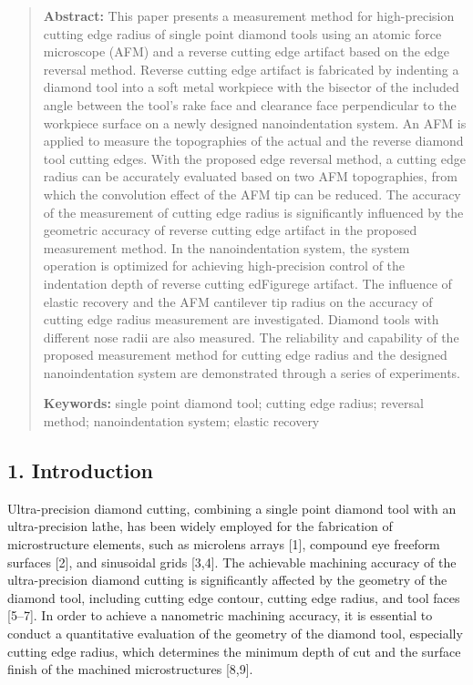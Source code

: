 \documentclass{article}
\begin{document}
\begin{quote}
\noindent\textbf{Abstract:} This paper presents a measurement method for high-precision cutting edge radius of single point diamond tools using an atomic force microscope (AFM) and a reverse cutting edge artifact based on the edge reversal method. Reverse cutting edge artifact is fabricated by indenting a diamond tool into a soft metal workpiece with the bisector of the included angle between the tool’s rake face and clearance face perpendicular to the workpiece surface on a newly designed nanoindentation system. An AFM is applied to measure the topographies of the actual and the reverse diamond tool cutting edges. With the proposed edge reversal method, a cutting edge radius can be accurately evaluated based on two AFM topographies, from which the convolution effect of the AFM tip can be reduced. The accuracy of the measurement of cutting edge radius is significantly influenced by the geometric accuracy of reverse cutting edge artifact in the proposed measurement method. In the nanoindentation system, the system operation is optimized for achieving high-precision control of the indentation depth of reverse cutting edFigurege artifact. The influence of elastic recovery and the AFM cantilever tip radius on the accuracy of cutting edge radius measurement are investigated. Diamond tools with different nose radii are also measured. The reliability and capability of the proposed measurement method for cutting edge radius and the designed nanoindentation system are demonstrated through a series of experiments.

\noindent\textbf{Keywords:} single point diamond tool; cutting edge radius; reversal method; nanoindentation system; elastic recovery
\end{quote}

\subsection*{1. Introduction}

Ultra-precision diamond cutting, combining a single point diamond tool with an ultra-precision lathe, has been widely employed for the fabrication of microstructure elements, such as microlens arrays [1], compound eye freeform surfaces [2], and sinusoidal grids [3,4]. The achievable machining accuracy of the ultra-precision diamond cutting is significantly affected by the geometry of the diamond tool, including cutting edge contour, cutting edge radius, and tool faces [5–7]. In order to achieve a nanometric machining accuracy, it is essential to conduct a quantitative evaluation of the geometry of the diamond tool, especially cutting edge radius, which determines the minimum depth of cut and the surface finish of the machined microstructures [8,9].
\end{document}
